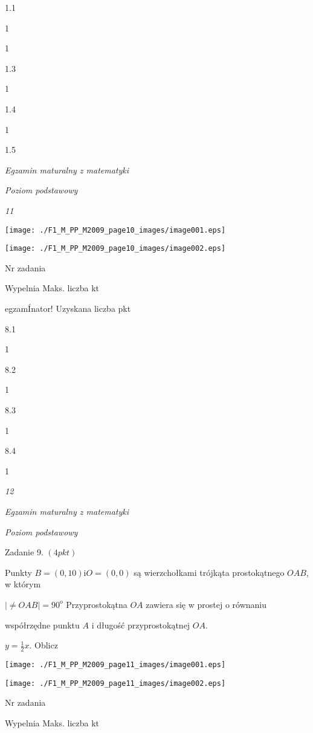 \documentclass[a4paper,12pt]{article}
\begin{document}
1.1

1

1

1.3

1

1.4

1

1.5





{\it Egzamin maturalny z matematyki}

{\it Poziom podstawowy}

{\it 11}
\begin{center}
\texttt{[image: ./F1\_M\_PP\_M2009\_page10\_images/image001.eps]}

\texttt{[image: ./F1\_M\_PP\_M2009\_page10\_images/image002.eps]}
\end{center}
Nr zadania

Wypelnia Maks. liczba kt

egzamÍnator! Uzyskana liczba pkt

8.1

1

8.2

1

8.3

1

8.4

1





{\it 12}

{\it Egzamin maturalny z matematyki}

{\it Poziom podstawowy}

Zadanie 9. $(4pkt)$

Punkty $B=(0,10) \mathrm{i} O=(0,0)$ są wierzchołkami trójkąta prostokątnego $OAB$, w którym

$|\neq OAB|=90^{\mathrm{o}}$ Przyprostokątna $OA$ zawiera się w prostej o równaniu

współrzędne punktu $A$ i długość przyprostokątnej $OA.$

$y=\displaystyle \frac{1}{2}x$. Oblicz
\begin{center}
\texttt{[image: ./F1\_M\_PP\_M2009\_page11\_images/image001.eps]}

\texttt{[image: ./F1\_M\_PP\_M2009\_page11\_images/image002.eps]}
\end{center}
Nr zadania

Wypelnia Maks. liczba kt
\end{document}

